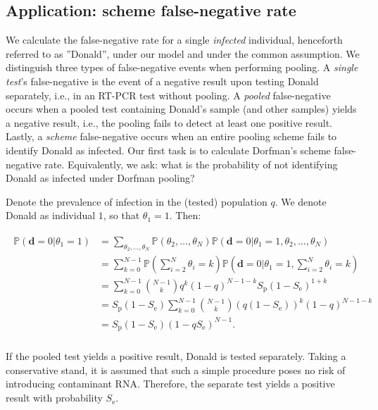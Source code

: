 \documentclass{article}
\newcommand{\Se}{S_\text{e}}
\newcommand{\Sp}{S_\text{p}}
\renewcommand{\Pr}{\mathbb{P}}
\newcommand{\data}{\mathbf{d}}
\begin{document}
\subsection*{Application: scheme false-negative rate}
We calculate the false-negative rate for a single \emph{infected}
individual, henceforth referred to as ''Donald'', under our model and
under the common assumption. We distinguish three types of
false-negative events when performing pooling. A \emph{single test}'s
false-negative is the event of a negative result upon testing Donald
separately, i.e., in an RT-PCR test without pooling. A \emph{pooled}
false-negative occurs when a pooled test containing Donald's sample
(and other samples) yields a negative result, i.e., the pooling fails
to detect at least one positive result. Lastly, a \emph{scheme}
false-negative occurs when an entire pooling scheme fails to identify
Donald as infected. Our first task is to calculate Dorfman's scheme
false-negative rate. Equivalently, we ask: what is the probability of
not identifying Donald as infected under Dorfman pooling?

Denote the prevalence of infection in the (tested) population $q$. We
denote Donald as individual $1$, so that $\theta_1=1$. Then:

\begin{align}
  \begin{split}
    \Pr(\data=0|\theta_1=1) &= \sum_{\theta_2,\dots,\theta_N}
    \Pr(\theta_2,\dots,\theta_N)
    \Pr(\data=0|\theta_1=1,\theta_2,\dots,\theta_N) \\
    &= \sum_{k=0}^{N-1}\Pr\left(\sum_{i=2}^N\theta_i=k\right)
    \Pr\left(\data=0|\theta_1=1,\sum_{i=2}^N\theta_i = k\right)\\
    &= \sum_{k=0}^{N-1}\binom{N-1}{k}q^k(1-q)^{N-1-k} \Sp(1-\Se)^{1+k}\\
    &= \Sp(1-\Se) \sum_{k=0}^{N-1}\binom{N-1}{k}
    \left(q(1-\Se)\right)^k(1-q)^{N-1-k}\\
    &= \Sp(1-\Se)(1-q\Se)^{N-1}. \\
  \end{split}
\end{align}

If the pooled test yields a positive result, Donald is tested
separately. Taking a conservative stand, it is assumed that such a
simple procedure poses no risk of introducing contaminant
RNA. Therefore, the separate test yields a positive result with
probability $\Se$.
\end{document}
